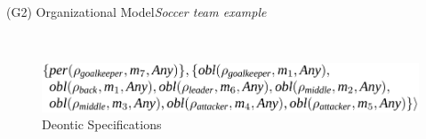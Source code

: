 \begin{frame}{(G2) Organizational Model}{\textit{Soccer team example}}



    \ \\

    \begin{minipage}{\textwidth}
        \centering
        \begin{figure}[H]
            \centering
            \includegraphics[width=0.4\linewidth]{figures/soccer_ds.png}
            \caption*{Deontic Specifications}
        \end{figure}
    \end{minipage}


\end{frame}
